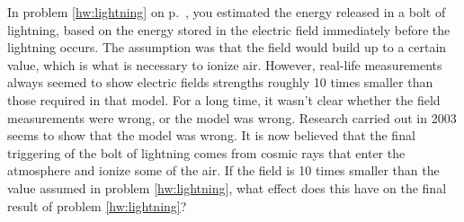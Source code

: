 In problem \ref{hw:lightning} on p.~\pageref{hw:lightning}, you estimated the energy released in a
bolt of lightning, based on the energy stored in the
electric field immediately before the lightning occurs. The
assumption was that the field would build up to a certain
value, which is what is necessary to ionize air. However,
real-life measurements always seemed to show electric fields
strengths roughly 10 times smaller than those required in
that model. For a long time, it wasn't clear whether the
field measurements were wrong, or the model was wrong.
Research carried out in 2003 seems to show that the model
was wrong. It is now believed that the final triggering of
the bolt of lightning comes from cosmic rays that enter the
atmosphere and ionize some of the air. If the field is 10
times smaller than the value assumed in problem \ref{hw:lightning}, what
effect does this have on the final result of problem \ref{hw:lightning}?\answercheck\hwendpart
